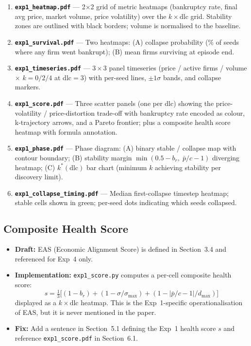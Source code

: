 \documentclass{article}
\begin{document}
\begin{enumerate}
  \item \textbf{\texttt{exp1\_heatmap.pdf}} --- 2$\times$2 grid of metric heatmaps
        (bankruptcy rate, final avg price, market volume, price volatility) over the
        $k \times \mathrm{dlc}$ grid.  Stability zones are outlined with black
        borders; volume is normalised to the baseline.
  \item \textbf{\texttt{exp1\_survival.pdf}} --- Two heatmaps: (A) collapse
        probability (\% of seeds where any firm went bankrupt); (B) mean firms
        surviving at episode end.
  \item \textbf{\texttt{exp1\_timeseries.pdf}} --- $3\times3$ panel timeseries
        (price / active firms / volume $\times$ $k = 0/2/4$ at dlc$=3$) with
        per-seed lines, $\pm 1\sigma$ bands, and collapse markers.
  \item \textbf{\texttt{exp1\_score.pdf}} --- Three scatter panels (one per dlc)
        showing the price-volatility / price-distortion trade-off with bankruptcy
        rate encoded as colour, k-trajectory arrows, and a Pareto frontier; plus a
        composite health score heatmap with formula annotation.
  \item \textbf{\texttt{exp1\_phase.pdf}} --- Phase diagram: (A) binary stable /
        collapse map with contour boundary; (B) stability margin
        $\min(0.5 - b_r,\; \bar{p}/c - 1)$ diverging heatmap; (C) $k^*(\mathrm{dlc})$
        bar chart (minimum $k$ achieving stability per discovery limit).
  \item \textbf{\texttt{exp1\_collapse\_timing.pdf}} --- Median first-collapse
        timestep heatmap; stable cells shown in green; per-seed dots indicating
        which seeds collapsed.
\end{enumerate}

\subsection{Composite Health Score}

\begin{itemize}
  \item \textbf{Draft:} EAS (Economic Alignment Score) is defined in Section~3.4
        and referenced for Exp~4 only.
  \item \textbf{Implementation:} \texttt{exp1\_score.py} computes a per-cell
        composite health score:
        \[
          s = \tfrac{1}{3}\bigl[(1-b_r) + (1 - \sigma/\sigma_{\max}) +
              (1 - |\bar{p}/c - 1|/d_{\max})\bigr]
        \]
        displayed as a $k \times \mathrm{dlc}$ heatmap.  This is the Exp~1-specific
        operationalisation of EAS, but it is never mentioned in the paper.
  \item \textbf{Fix:} Add a sentence in Section~5.1 defining the Exp~1 health
        score $s$ and reference \texttt{exp1\_score.pdf} in Section~6.1.
\end{itemize}
\end{document}
